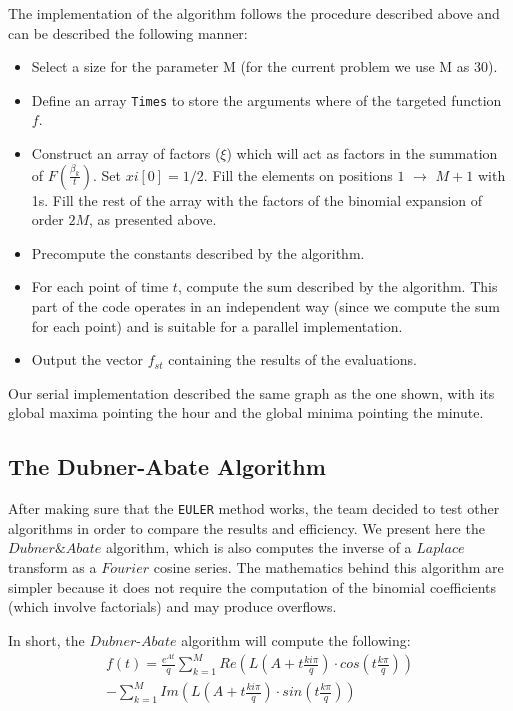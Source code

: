 The implementation of the algorithm follows the procedure described above and can be described the following manner:
\begin{itemize}
\item{Select a size for the parameter M (for the current problem we use M as 30).}
\item{Define an array \texttt{Times} to store the arguments where of the targeted function $f$.}
\item{Construct an array of factors ($\xi$) which will act as factors in the summation of $F(\frac{\beta_k}{t})$. Set $xi[0] = 1/2$. Fill the elements on positions $1$ $\to$ $M+1$ with 1s. Fill the rest of the array with the factors of the binomial expansion of order $2M$, as presented above.}
\item{Precompute the constants described by the algorithm.}
\item{For each point of time $t$, compute the sum described by the algorithm. This part of the code operates in an independent way (since we compute the sum for each point) and is suitable for a parallel implementation.}
\item{Output the vector $f_{st}$ containing the results of the evaluations.}
\end{itemize} 

Our serial implementation described the same graph as the one shown, with its global maxima pointing the hour and the global minima pointing the minute.


\subsection{The Dubner-Abate Algorithm}
After making sure that the \texttt{EULER} method works, the team decided to test other algorithms in order to compare the results and efficiency.
We present here the $Dubner \& Abate$ algorithm, which is also computes the inverse of a $Laplace$ transform as a $Fourier$ cosine series.
The mathematics behind this algorithm are simpler because it does not require the computation of the binomial coefficients (which involve factorials) and may produce overflows.

In short, the $Dubner$-$Abate$ algorithm will compute the following:
\begin{align*}
f(t) = \frac{e^{At}}{q} \sum\limits_{k=1}^{M}{Re(L(A+t\frac{ki\pi}{q}) \cdot cos(t\frac{k\pi}{q}))} \\
- \sum\limits_{k=1}^{M}{Im(L(A+t\frac{ki\pi}{q}) \cdot sin(t\frac{k\pi}{q}) )}
\end{align*}
\newline

